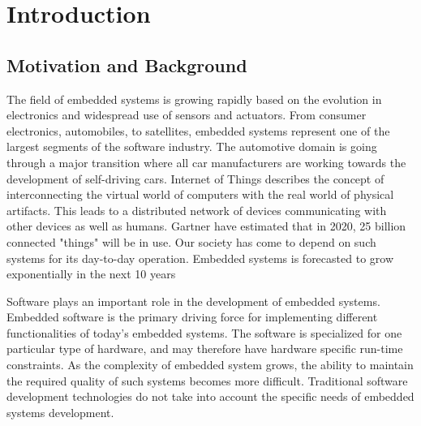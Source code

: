 \chapter{Introduction}

\section{Motivation and Background}
The field of embedded systems is growing rapidly based on the evolution in electronics and widespread use of sensors and actuators. From consumer electronics, automobiles, to satellites, embedded systems represent one of the largest segments of the software industry. The automotive domain is going through a major transition where all car manufacturers are working towards the development of self-driving cars. Internet of Things describes the concept of interconnecting the virtual world of computers with the real world of physical artifacts\cite{mattern2010internet}. This leads to a distributed network of devices communicating with other devices as well as humans. Gartner\cite{gartner} have estimated that in 2020, 25 billion connected "things" will be in use. Our society has come to depend on such systems for its day-to-day operation. Embedded systems is forecasted to grow exponentially in the next 10 years\cite{graaf2003embedded}

Software plays an important role in the development of embedded systems\cite{ebert2009embedded}. Embedded software is the primary driving force for implementing different functionalities of today's embedded systems. The software is specialized for one particular type of hardware, and may therefore have hardware specific run-time constraints. As the complexity of embedded system grows, the ability to maintain the required quality of such systems becomes more difficult\cite{ebert2009embedded}. Traditional software development technologies do not take into account the specific needs of embedded systems development\cite{graaf2003embedded}.

